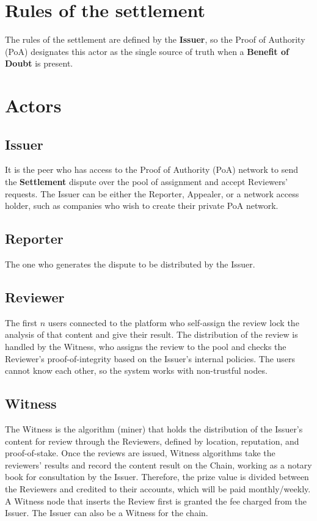 \documentclass{article}
\begin{document}
\section{Rules of the settlement}

The rules of the settlement are defined by the \textbf{Issuer}, so the Proof of Authority (PoA) designates this actor as the single source of truth when a \textbf{Benefit of Doubt} is present.

\section{Actors}

\subsection{Issuer}
It is the peer who has access to the Proof of Authority (PoA) network to send the \textbf{Settlement} dispute over the pool of assignment and accept Reviewers' requests. The Issuer can be either the Reporter, Appealer, or a network access holder, such as companies who wish to create their private PoA network.

\subsection{Reporter}
The one who generates the dispute to be distributed by the Issuer.

\subsection{Reviewer}
The first \(n\) users connected to the platform who self-assign the review lock the analysis of that content and give their result. The distribution of the review is handled by the Witness, who assigns the review to the pool and checks the Reviewer's proof-of-integrity based on the Issuer's internal policies. The users cannot know each other, so the system works with non-trustful nodes.

\subsection{Witness}
The Witness is the algorithm (miner) that holds the distribution of the Issuer's content for review through the Reviewers, defined by location, reputation, and proof-of-stake. Once the reviews are issued, Witness algorithms take the reviewers' results and record the content result on the Chain, working as a notary book for consultation by the Issuer. Therefore, the prize value is divided between the Reviewers and credited to their accounts, which will be paid monthly/weekly. A Witness node that inserts the Review first is granted the fee charged from the Issuer. The Issuer can also be a Witness for the chain.
\end{document}
